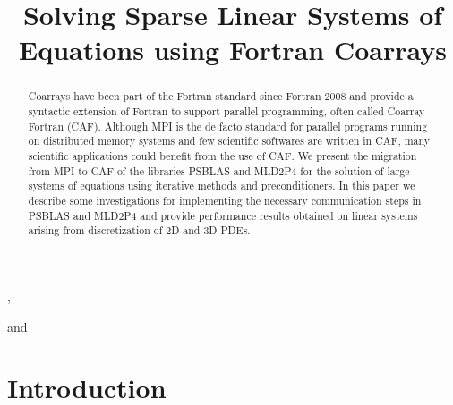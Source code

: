 \documentclass{IOS-Book-Article}
\def\hb{\hbox to 10.7 cm{}}
\begin{document}
\pagestyle{headings}
\def\thepage{}

\begin{frontmatter}              %


\title{Solving Sparse Linear Systems of Equations using Fortran Coarrays}


\author[A]{ %
},
\author[A]{ }
and
\author[B]{ }

\address[A]{University of Rome Tor Vergata}
\address[B]{Cranfield University}

\begin{abstract}
Coarrays have been part of the Fortran standard since
Fortran 2008 and provide a syntactic extension of Fortran to
support parallel programming, often called Coarray Fortran (CAF). 
Although MPI is the de facto standard for parallel programs running on
distributed memory systems and few scientific softwares are written in
CAF, many scientific applications could benefit from the use of CAF.  
We present the migration from MPI to CAF of the libraries PSBLAS  and
MLD2P4 for the solution of large systems of equations using iterative
methods and preconditioners.  
In this paper we describe some investigations for implementing the
necessary communication steps in PSBLAS and MLD2P4 and provide
performance results obtained on linear systems arising from
discretization of 2D and 3D PDEs.    
\end{abstract}

\begin{keyword}
\end{keyword}
\end{frontmatter}



\section{Introduction}
\end{document}
